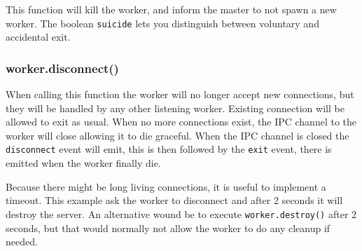 This function will kill the worker, and inform the master to not spawn a
new worker. The boolean \texttt{suicide} lets you distinguish between
voluntary and accidental exit.

\begin{Shaded}
\begin{Highlighting}[]
\NormalTok{(}\NormalTok{, }
   \NormalTok{(} \NormalTok{=== }\NormalTok{) \{}
    \NormalTok{(}
  \NormalTok{\}}
\NormalTok{\});}

\NormalTok{();}
\end{Highlighting}
\end{Shaded}

\subsubsection{worker.disconnect()}

When calling this function the worker will no longer accept new
connections, but they will be handled by any other listening worker.
Existing connection will be allowed to exit as usual. When no more
connections exist, the IPC channel to the worker will close allowing it
to die graceful. When the IPC channel is closed the \texttt{disconnect}
event will emit, this is then followed by the \texttt{exit} event, there
is emitted when the worker finally die.

Because there might be long living connections, it is useful to
implement a timeout. This example ask the worker to disconnect and after
2 seconds it will destroy the server. An alternative wound be to execute
\texttt{worker.destroy()} after 2 seconds, but that would normally not
allow the worker to do any cleanup if needed.


